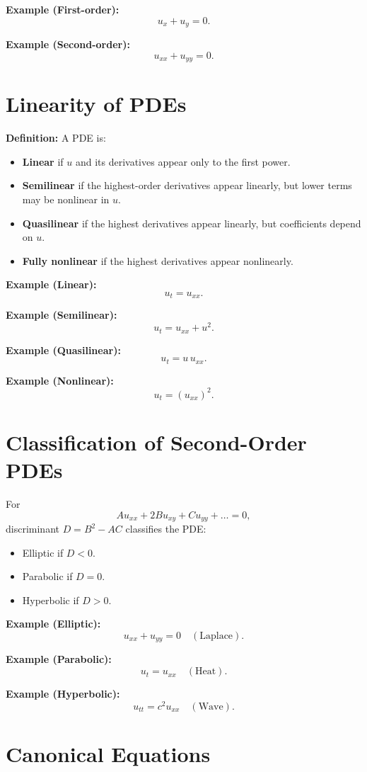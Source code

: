 \documentclass[12pt]{book}
\begin{document}
\textbf{Example (First-order):}
\[
u_x + u_y = 0.
\]

\textbf{Example (Second-order):}
\[
u_{xx} + u_{yy} = 0.
\]

\chapter{Linearity of PDEs}
\textbf{Definition:} A PDE is:
\begin{itemize}
\item \textbf{Linear} if $u$ and its derivatives appear only to the first power.
\item \textbf{Semilinear} if the highest-order derivatives appear linearly, but lower terms may be nonlinear in $u$.
\item \textbf{Quasilinear} if the highest derivatives appear linearly, but coefficients depend on $u$.
\item \textbf{Fully nonlinear} if the highest derivatives appear nonlinearly.
\end{itemize}

\textbf{Example (Linear):}
\[
u_t = u_{xx}.
\]

\textbf{Example (Semilinear):}
\[
u_t = u_{xx} + u^2.
\]

\textbf{Example (Quasilinear):}
\[
u_t = u\,u_{xx}.
\]

\textbf{Example (Nonlinear):}
\[
u_t = (u_{xx})^2.
\]

\chapter{Classification of Second-Order PDEs}
For
\[
A u_{xx} + 2B u_{xy} + C u_{yy} + \dots = 0,
\]
discriminant $D = B^2 - AC$ classifies the PDE:
\begin{itemize}
\item Elliptic if $D < 0$.
\item Parabolic if $D = 0$.
\item Hyperbolic if $D > 0$.
\end{itemize}

\textbf{Example (Elliptic):}
\[
u_{xx} + u_{yy} = 0 \quad (\text{Laplace}).
\]

\textbf{Example (Parabolic):}
\[
u_t = u_{xx} \quad (\text{Heat}).
\]

\textbf{Example (Hyperbolic):}
\[
u_{tt} = c^2 u_{xx} \quad (\text{Wave}).
\]

\chapter{Canonical Equations}
\end{document}
